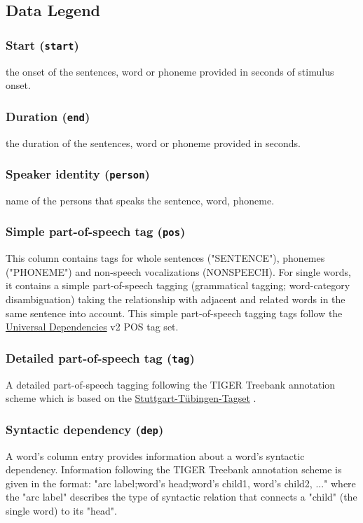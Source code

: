 \documentclass[10pt,a4paper,twocolumn]{article}
\begin{document}
\subsection*{Data Legend}
\subsubsection*{Start (\texttt{start})}
the onset of the sentences, word or phoneme provided in seconds of stimulus onset.
\subsubsection*{Duration (\texttt{end})}
the duration of the sentences, word or phoneme provided in seconds.
\subsubsection*{Speaker identity (\texttt{person})}
name of the persons that speaks the sentence, word, phoneme.
\subsubsection*{Simple part-of-speech tag (\texttt{pos})}
This column contains tags for whole sentences ("SENTENCE"), phonemes ("PHONEME") and non-speech vocalizations (NONSPEECH). For single words, it contains a simple part-of-speech tagging (grammatical tagging; word-category disambiguation) taking the relationship with adjacent and related words in the same sentence into account. This simple part-of-speech tagging tags follow the \href{https://universaldependencies.org}{Universal Dependencies} v2 POS tag set.

\subsubsection*{Detailed part-of-speech tag (\texttt{tag})}
A detailed part-of-speech tagging following the TIGER Treebank annotation scheme \citep{brants2004tiger} which is based on the \href{https://www.ims.uni-stuttgart.de/forschung/ressourcen/lexika/germantagsets}{Stuttgart-Tübingen-Tagset} \citep{schiller1999stts}.
\subsubsection*{Syntactic dependency (\texttt{dep})}
A word's column entry provides information about a word's syntactic dependency. Information following the TIGER Treebank annotation scheme \citep{brants2004tiger} is given in the format:
"arc label;word's head;word's child1, word's child2, ..." where the "arc label" describes the type of syntactic relation that connects a "child" (the single word) to its "head".
\end{document}
